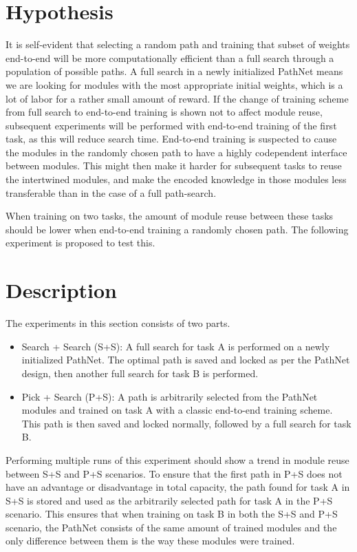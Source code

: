 \section{Hypothesis}
It is self-evident that selecting a random path and training that subset of weights end-to-end will be more computationally efficient than a full search through a population of possible paths. A full search in a newly initialized PathNet means we are looking for modules with the most appropriate initial weights, which is a lot of labor for a rather small amount of reward. If the change of training scheme from full search to end-to-end training is shown not to affect module reuse, subsequent experiments will be performed with end-to-end training of the first task, as this will reduce search time. End-to-end training is suspected to cause the modules in the randomly chosen path to have a highly codependent interface between modules. This might then make it harder for subsequent tasks to reuse the intertwined modules, and make the encoded knowledge in those modules less transferable than in the case of a full path-search. 

When training on two tasks, the amount of module reuse between these tasks should be lower when end-to-end training a randomly chosen path. The following experiment is proposed to test this.

\section{Description}
The experiments in this section consists of two parts. 
\begin{itemize}
    \item Search + Search (S+S): A full search for task A is performed on a newly initialized PathNet. The optimal path is saved and locked as per the PathNet design, then another full search for task B is performed.
    \item Pick + Search (P+S): A path is arbitrarily selected from the PathNet modules and trained on task A with a classic end-to-end training scheme. This path is then saved and locked normally, followed by a full search for task B.
\end{itemize}
Performing multiple runs of this experiment should show a trend in module reuse between S+S and P+S scenarios. To ensure that the first path in P+S does not have an advantage or disadvantage in total capacity,  the path found for task A in S+S is stored and used as the arbitrarily selected path for task A in the P+S scenario. This ensures that when training on task B in both the S+S and P+S scenario, the PathNet consists of the same amount of trained modules and the only difference between them is the way these modules were trained.

